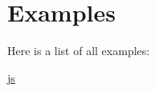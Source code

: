 \section{Examples}
Here is a list of all examples\+:\begin{DoxyCompactItemize}
\item 
\hyperlink{js-example}{js}
\end{DoxyCompactItemize}
